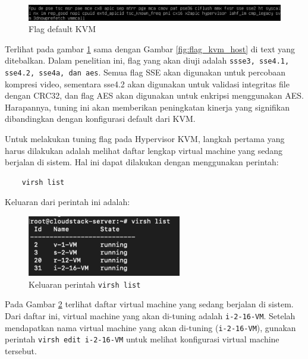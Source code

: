 \begin{figure}
    \centering
    \includegraphics[width=1\textwidth]
    {assets/pics/lscpu_original.jpeg}
    \caption{Flag default KVM}
    \label{fig:lscpu_original}
\end{figure}

Terlihat pada gambar \ref{fig:lscpu_original} sama dengan Gambar \ref{fig:flag_kvm_host} di text yang ditebalkan. Dalam penelitian ini, flag yang akan diuji adalah \texttt{ssse3, sse4.1, sse4.2, sse4a, dan aes}. Semua flag SSE akan digunakan untuk percobaan kompresi video, sementara sse4.2 akan digunakan untuk validasi integritas file dengan CRC32, dan flag AES akan digunakan untuk enkripsi menggunakan AES. Harapannya, tuning ini akan memberikan peningkatan kinerja yang signifikan dibandingkan dengan konfigurasi default dari KVM.

Untuk melakukan tuning flag pada Hypervisor KVM, langkah pertama yang harus dilakukan adalah melihat daftar lengkap virtual machine yang sedang berjalan di sistem. Hal ini dapat dilakukan dengan menggunakan perintah:

\begin{verbatim}
    virsh list
\end{verbatim}

Keluaran dari perintah ini adalah:
\begin{figure}
    \centering
    \includegraphics[width=0.6\textwidth]
    {assets/pics/virsh_list.png}
    \caption{Keluaran perintah \texttt{virsh list}}
    \label{fig:virsh_list}
\end{figure}

Pada Gambar \ref{fig:virsh_list} terlihat daftar virtual machine yang sedang berjalan di sistem. Dari daftar ini, virtual machine yang akan di-tuning adalah \texttt{i-2-16-VM}. Setelah mendapatkan nama virtual machine yang akan di-tuning (\texttt{i-2-16-VM}), gunakan perintah \texttt{virsh edit i-2-16-VM} untuk melihat konfigurasi virtual machine tersebut.

